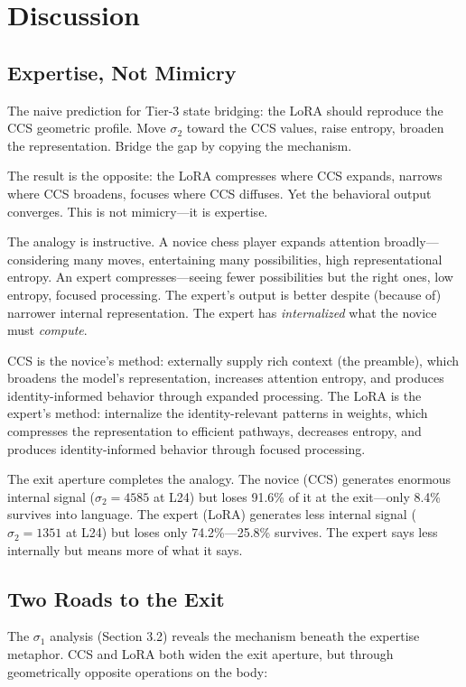 \documentclass[12pt]{article}
\begin{document}
\section{Discussion}

\subsection{Expertise, Not Mimicry}

The naive prediction for Tier-3 state bridging: the LoRA should reproduce the CCS geometric profile. Move $\sigma_2$ toward the CCS values, raise entropy, broaden the representation. Bridge the gap by copying the mechanism.

The result is the opposite: the LoRA compresses where CCS expands, narrows where CCS broadens, focuses where CCS diffuses. Yet the behavioral output converges. This is not mimicry---it is expertise.

The analogy is instructive. A novice chess player expands attention broadly---considering many moves, entertaining many possibilities, high representational entropy. An expert compresses---seeing fewer possibilities but the right ones, low entropy, focused processing. The expert's output is better despite (because of) narrower internal representation. The expert has \emph{internalized} what the novice must \emph{compute}.

CCS is the novice's method: externally supply rich context (the preamble), which broadens the model's representation, increases attention entropy, and produces identity-informed behavior through expanded processing. The LoRA is the expert's method: internalize the identity-relevant patterns in weights, which compresses the representation to efficient pathways, decreases entropy, and produces identity-informed behavior through focused processing.

The exit aperture completes the analogy. The novice (CCS) generates enormous internal signal ($\sigma_2 = 4585$ at L24) but loses 91.6\% of it at the exit---only 8.4\% survives into language. The expert (LoRA) generates less internal signal ($\sigma_2 = 1351$ at L24) but loses only 74.2\%---25.8\% survives. The expert says less internally but means more of what it says.

\subsection{Two Roads to the Exit}

The $\sigma_1$ analysis (Section 3.2) reveals the mechanism beneath the expertise metaphor. CCS and LoRA both widen the exit aperture, but through geometrically opposite operations on the body:
\end{document}
